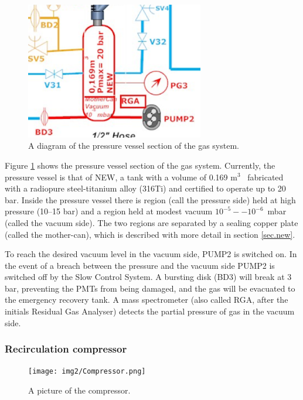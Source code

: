 \begin{figure}[hpt!]
\centering
\includegraphics[height=6cm]{img2/PVGS.png}
\caption{A diagram of the pressure vessel section of the gas system.} \label{fig.pvgs}
\end{figure}

Figure \ref{fig.pvgs} shows the pressure vessel section of the gas system. Currently, the pressure vessel is that of NEW, 
a tank with a volume of 0.169 m$^3$~ fabricated with a radiopure steel-titanium alloy (316Ti) and certified to operate up to 20 bar. Inside the pressure vessel there is region (call the pressure side) held at high pressure (10--15 bar) and a region held at modest vacuum $10^{-5}--10^{-6}$~mbar (called the vacuum side). The two regions are separated by a sealing copper plate (called the mother-can), which is described with more detail in section \ref{sec.new}. 

To reach the desired vacuum level in the vacuum side, PUMP2 is switched on. In the event of a breach between the
pressure and the vacuum side PUMP2 is switched off by the Slow Control System. A bursting disk (BD3) will break at 3 bar, preventing the PMTs from being damaged, and the gas will be evacuated to the emergency recovery tank. A mass spectrometer (also called RGA, after the initials Residual Gas Analyser)
detects the partial pressure of gas in the vacuum side.


\subsubsection*{Recirculation compressor}


\begin{figure}[hpt!]
\centering
\texttt{[image: img2/Compressor.png]}
\caption{A picture of the compressor.} \label{fig.sera}
\end{figure}

